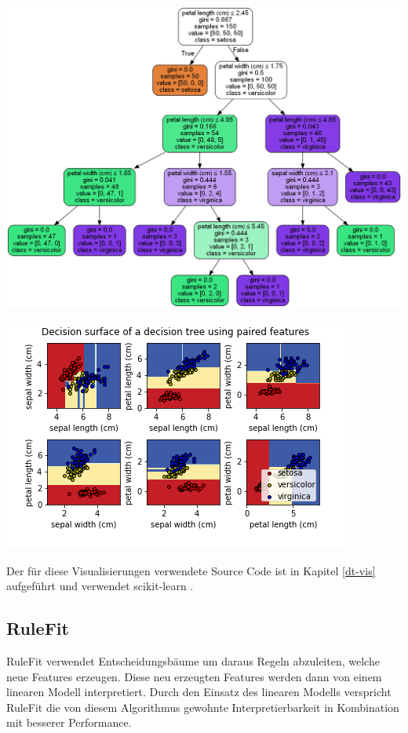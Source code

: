 \documentclass[
  12pt, %
  a4paper, %
  oneside, %
  openany, 
  numbers=noenddot, %
  BCOR=5mm, %
  parskip=half*, %
  thesis, %
]{bfhbook}
\begin{document}
\begin{minipage}[t]{0.45\linewidth}
\centering
	\includegraphics[width=\textwidth]{Bilder/iris-dt-explained.png}
\end{minipage}\hfill
\begin{minipage}[t]{0.45\linewidth}
\centering
	\includegraphics[width=\textwidth]{Bilder/iris-dt-decision-surface.png}
\end{minipage}

Der für diese Visualisierungen verwendete Source Code ist in Kapitel \ref{dt-vis} aufgeführt und verwendet scikit-learn \cite{scikit-learnLink}.


\subsection{RuleFit}
\label{RF}
RuleFit \parencite{Friedman2008} verwendet Entscheidungsbäume um daraus Regeln abzuleiten, welche neue Features erzeugen. Diese neu erzeugten Features werden dann von einem linearen Modell interpretiert. Durch den Einsatz des linearen Modells verspricht RuleFit die von diesem Algorithmus gewohnte Interpretierbarkeit in Kombination mit besserer Performance.
\end{document}
